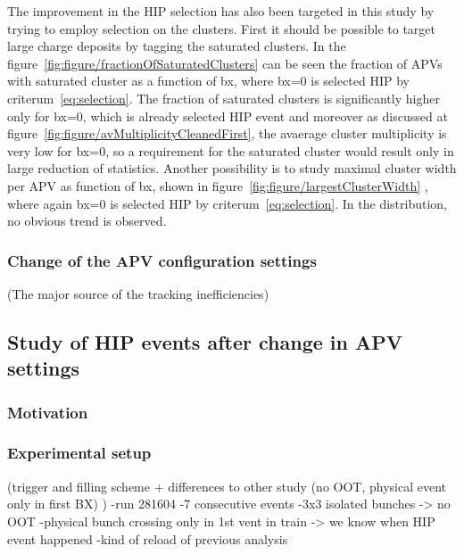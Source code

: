 The improvement in the HIP selection has also been targeted in this study by trying to employ selection on the clusters. First it should be possible to target large charge deposits by tagging the saturated clusters. In the figure~\ref{fig:figure/fractionOfSaturatedClusters} can be  seen the fraction of APVs with saturated cluster as a function of bx, where bx=0 is selected HIP by criterum~\ref{eq:selection}. The fraction of saturated clusters is significantly higher only for bx=0, which is already selected HIP event and moreover as discussed at figure~\ref{fig:figure/avMultiplicityCleanedFirst}, the avaerage cluster multiplicity is very low for bx=0, so a requirement for the saturated cluster would result only in large reduction of statistics. Another possibility is to study maximal cluster width per APV as function of bx, shown in figure~\ref{fig:figure/largestClusterWidth} , where again bx=0 is selected HIP by criterum~\ref{eq:selection}. In the distribution, no obvious trend is observed. 



\subsubsection{Change of the APV configuration settings}
          (The major source of the tracking inefficiencies)

\subsection{Study of HIP events after change in APV settings}

\subsubsection{Motivation}

\subsubsection{Experimental setup}
        (trigger and filling scheme + differences to other study (no OOT, physical event only in first BX) )
-run 281604
-7 consecutive events
-3x3 isolated bunches -> no OOT
-physical bunch crossing only in 1st vent in train
-> we know when HIP event happened
-kind of reload of previous analysis
